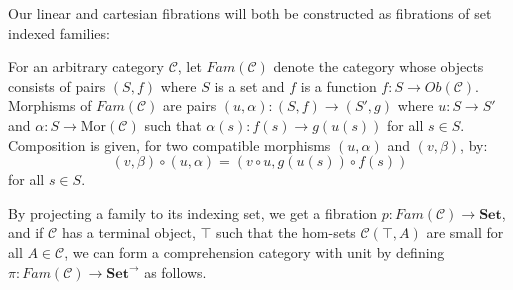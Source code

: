 Our linear and cartesian fibrations will both be constructed as fibrations of set indexed families:
\begin{defn}
For an arbitrary category $\mathcal{C}$, let $Fam(\mathcal{C})$ denote the category whose objects consists of pairs $(S, f)$ where $S$ is a set and $f$ is a function $f : S \to Ob(\mathcal{C})$. Morphisms of $Fam(\mathcal{C})$ are pairs $(u, \alpha) : (S, f) \to (S', g)$ where $u : S \to S'$ and $\alpha : S \to \text{Mor}(\mathcal{C})$ such that $\alpha(s) : f(s) \to g(u(s))$ for all $s \in S$. Composition is given, for two compatible morphisms $(u, \alpha)$ and $(v, \beta)$, by:
\[
(v, \beta) \circ (u, \alpha) = (v \circ u, g(u(s)) \circ f(s))
\]
for all $s \in S$.
\end{defn}
By projecting a family to its indexing set, we get a fibration $p : Fam(\mathcal{C}) \to \mathbf{Set}$, and if $\mathcal{C}$ has a terminal object, $\top$ such that the hom-sets $\mathcal{C}(\top,A)$ are small for all $A \in \mathcal{C}$, we can form a comprehension category with unit by defining $\pi : Fam(\mathcal{C}) \to \mathbf{Set}^\to$ as follows.

